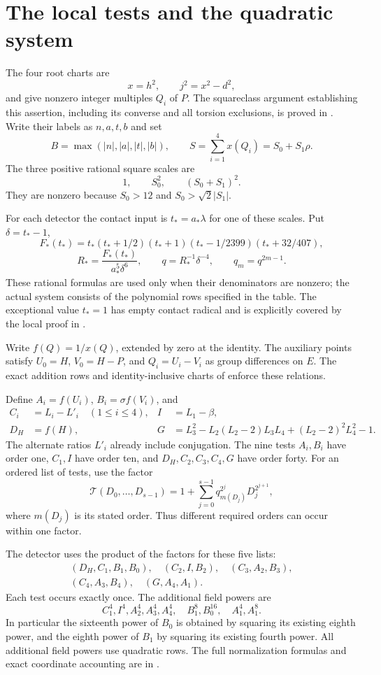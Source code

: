 \documentclass[11pt,a4paper]{article}
\theoremstyle{remark}\newtheorem{remark}[theorem]{Remark}
\begin{document}
\section{The local tests and the quadratic system}
The four root charts are
\[
 x=h^2,\qquad j^2=x^2-d^2,
\]
and give nonzero integer multiples $Q_i$ of $P$. The squareclass
argument establishing this assertion, including its converse and all
torsion exclusions, is proved in \cite[Section~2]{Baseline}.
Write their labels as $n,a,t,b$ and set
\[
 B=\max(|n|,|a|,|t|,|b|),\qquad
 S=\sum_{i=1}^4x(Q_i)=S_0+S_1\rho.
\]
The three positive rational square scales are
\[
                         1,\qquad S_0^2,\qquad(S_0+S_1)^2.
\]
They are nonzero because $S_0>12$ and $S_0>\sqrt2|S_1|$.

For each detector the contact input is $t_*=a_*\lambda$ for one of
these scales. Put $\delta=t_*-1$,
\[
 F_*(t_*)=t_*(t_*+1/2)(t_*+1)(t_*-1/2399)(t_*+32/407),
\]
\[
 R_*=\frac{F_*(t_*)}{a_*^5\delta^6},\qquad
 q=R_*^{-1}\delta^{-4},\qquad q_m=q^{2m-1}.
\]
These rational formulas are used only when their denominators are
nonzero; the actual system consists of the polynomial rows specified
in the table. The exceptional value $t_*=1$ has empty contact radical
and is explicitly covered by the local proof in \cite{Packing}.

Write $f(Q)=1/x(Q)$, extended by zero at the identity. The auxiliary
points satisfy $U_0=H$, $V_0=H-P$, and $Q_i=U_i-V_i$ as group
differences on $E$. The exact addition rows and identity-inclusive
charts of \cite{Baseline} enforce these relations.

Define $A_i=f(U_i)$, $B_i=\sigma f(V_i)$, and
\[
 \begin{aligned}
 C_i&=L_i-L'_i\quad(1\le i\le4),& I&=L_1-\beta,\\
 D_H&=f(H),&G&=L_3^2-L_2(L_2-2)L_3L_4+(L_2-2)^2L_4^2-1.
 \end{aligned}
\]
The alternate ratios $L'_i$ already include conjugation. The nine tests
$A_i,B_i$ have order one, $C_1,I$ have order ten, and $D_H,C_2,C_3,C_4,G$
have order forty. For an ordered list of tests, use the factor
\[
 \mathcal T(D_0,\ldots,D_{s-1})
 =1+\sum_{j=0}^{s-1}q_{m(D_j)}^{2^j}D_j^{2^{j+1}},
\]
where $m(D_j)$ is its stated order. Thus different required orders can
occur within one factor.

The detector uses the product of the factors for these five lists:
\[
 \begin{gathered}
 (D_H,C_1,B_1,B_0),\quad(C_2,I,B_2),\quad(C_3,A_2,B_3),\\
 (C_4,A_3,B_4),\quad(G,A_4,A_1).
 \end{gathered}
\]
Each test occurs exactly once. The additional field powers are
\[
 C_1^4,I^4,A_2^4,A_3^4,A_4^4,\quad B_1^8,B_0^{16},\quad A_1^4,A_1^8.
\]
In particular the sixteenth power of $B_0$ is obtained by squaring its
existing eighth power, and the eighth power of $B_1$ by squaring its
existing fourth power. All additional field powers use quadratic rows.
The full normalization formulas and exact coordinate accounting are
in \cite{Packing}.
\end{document}
